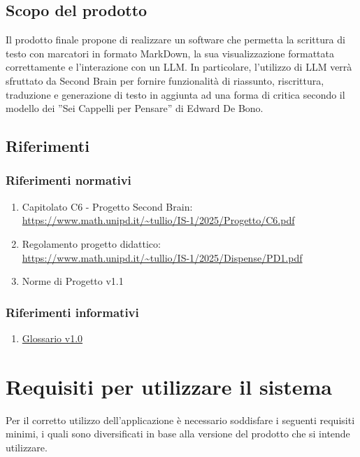 \documentclass[a4paper,10pt]{article}
\begin{document}
\subsection{Scopo del prodotto}
Il prodotto finale propone di realizzare un software che permetta la scrittura di testo con marcatori in formato MarkDown, la sua visualizzazione formattata correttamente e l’interazione con un LLM. In particolare, l’utilizzo di LLM verrà sfruttato da Second Brain per fornire funzionalità di riassunto, riscrittura, traduzione e generazione di testo in aggiunta ad una forma di critica secondo il modello dei ”Sei Cappelli per Pensare” di Edward De Bono. 

\subsection{Riferimenti}
\subsubsection{Riferimenti normativi}
\begin{enumerate}
    \item Capitolato C6 - Progetto Second Brain: \\ \url{https://www.math.unipd.it/~tullio/IS-1/2025/Progetto/C6.pdf}
    \item Regolamento progetto didattico: \\ \url{https://www.math.unipd.it/~tullio/IS-1/2025/Dispense/PD1.pdf}
    \item Norme di Progetto v1.1
\end{enumerate}
\subsubsection{Riferimenti informativi}
\begin{enumerate}
    \item \href{https://tool-8.github.io/Documentazione-SWE/glossario/Glossario.pdf}{Glossario v1.0} 
\end{enumerate}

\section{Requisiti per utilizzare il sistema}
Per il corretto utilizzo dell'applicazione è necessario soddisfare i seguenti requisiti minimi, i quali sono diversificati in base alla versione del prodotto che si intende utilizzare. 
\end{document}
